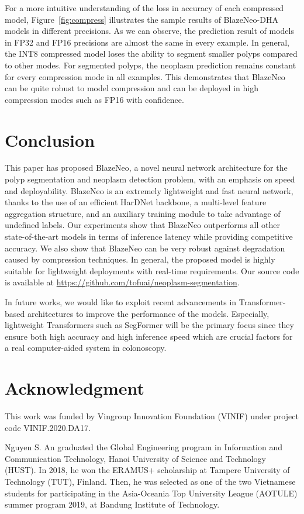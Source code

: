 \documentclass{ieeeaccess}
\newcommand{\ModelName}{BlazeNeo\xspace}
\newcommand{\DHA}{BlazeNeo-DHA\xspace}
\begin{document}
For a more intuitive understanding of the loss in accuracy of each compressed model, Figure~\ref{fig:compress} illustrates the sample results of \DHA models in different precisions. As we can observe, the prediction result of models in FP32 and FP16 precisions are almost the same in every example. In general, the INT8 compressed model loses the ability to segment smaller polyps compared to other modes. For segmented polyps, the neoplasm prediction remains constant for every compression mode in all examples. This demonstrates that \ModelName can be quite robust to model compression and can be deployed in high compression modes such as FP16 with confidence.

\section{Conclusion}
\label{sec:conclude}
This paper has proposed \ModelName, a novel neural network architecture for the polyp segmentation and neoplasm detection problem, with an emphasis on speed and deployability. \ModelName is an extremely lightweight and fast neural network, thanks to the use of an efficient HarDNet backbone, a multi-level feature aggregation structure, and an auxiliary training module to take advantage of undefined labels. Our experiments show that \ModelName outperforms all other state-of-the-art models in terms of inference latency while providing competitive accuracy. We also show that \ModelName can be very robust against degradation caused by compression techniques. In general, the proposed model is highly suitable for lightweight deployments with real-time requirements. Our source code is available at \url{https://github.com/tofuai/neoplasm-segmentation}.

In future works, we would like to exploit recent advancements in Transformer-based architectures to improve the performance of the models. Especially, lightweight Transformers such as SegFormer \cite{xie2021segformer} will be the primary focus since they ensure both high accuracy and high inference speed which are crucial factors for a real computer-aided system in colonoscopy.  

\section{Acknowledgment}
This work was funded by Vingroup Innovation Foundation (VINIF) under project code VINIF.2020.DA17. 





\begin{IEEEbiography}{Nguyen S. An} graduated the Global Engineering program in Information and Communication Technology, Hanoi University of Science and Technology (HUST). In 2018, he won the ERAMUS+ scholarship at Tampere University of Technology (TUT), Finland. Then, he was selected as one of the two Vietnamese students for participating in the Asia-Oceania Top University League (AOTULE) summer program 2019, at Bandung Institute of Technology.
\end{IEEEbiography}
\end{document}

